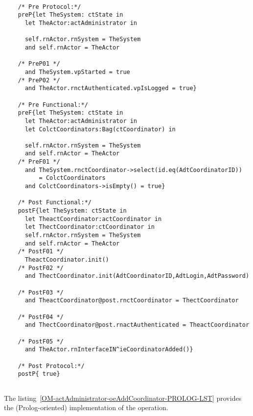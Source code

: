 	\scriptsize
	\vspace{0.5cm}
	\begin{lstlisting}[style=MessirStyle,firstnumber=auto,captionpos=b,caption={\msrmessir (MCL-oriented) specification of the operation \emph{oeAddCoordinator}.},label=OM-actAdministrator-oeAddCoordinator-MCL-LST]

	/* Pre Protocol:*/ 
	preP{let TheSystem: ctState in
	  let TheActor:actAdministrator in
	  
	  self.rnActor.rnSystem = TheSystem
	  and self.rnActor = TheActor
	  
	/* PreP01 */
	  and TheSystem.vpStarted = true
	/* PreP02 */
	  and TheActor.rnctAuthenticated.vpIsLogged = true}
	
	/* Pre Functional:*/
	preF{let TheSystem: ctState in
	  let TheActor:actAdministrator in
	  let ColctCoordinators:Bag(ctCoordinator) in
	  
	  self.rnActor.rnSystem = TheSystem
	  and self.rnActor = TheActor
	/* PreF01 */
	  and TheSystem.rnctCoordinator->select(id.eq(AdtCoordinatorID))
	      = ColctCoordinators
	  and ColctCoordinators->isEmpty() = true}
	
	/* Post Functional:*/ 
	postF{let TheSystem: ctState in
	  let TheactCoordinator:actCoordinator in
	  let ThectCoordinator:ctCoordinator in
	  self.rnActor.rnSystem = TheSystem
	  and self.rnActor = TheActor
	/* PostF01 */
	  TheactCoordinator.init()
	/* PostF02 */
	  and ThectCoordinator.init(AdtCoordinatorID,AdtLogin,AdtPassword)
	
	/* PostF03 */
	  and TheactCoordinator@post.rnctCoordinator = ThectCoordinator
	  
	/* PostF04 */  
	  and ThectCoordinator@post.rnactAuthenticated = TheactCoordinator
	   
	/* PostF05 */  
	  and TheActor.rnInterfaceIN^ieCoordinatorAdded()}
	
	/* Post Protocol:*/ 
	postP{ true}
	
	\end{lstlisting}
	\normalsize 
	
	
	
	
	
	\vspace{1cm}
	The listing~\ref{OM-actAdministrator-oeAddCoordinator-PROLOG-LST} provides the \msrmessir (Prolog-oriented) implementation of the operation.
	
	\scriptsize
	\vspace{0.5cm}
	
	
	\normalsize





